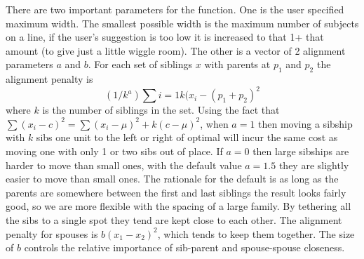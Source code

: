 \documentclass{article}
\begin{document}
There are two important parameters for the function.  One is the user specified
maximum width.  The smallest possible width is the maximum number of subjects
on a line, if the user's suggestion  %
is too low it is increased to that 1+ that
amount (to give just a little wiggle room).
The other is a vector of 2 alignment parameters $a$ and $b$.
For each set of siblings ${x}$ with parents at $p_1$ and $p_2$ the
alignment penalty is
$$
   (1/k^a)\sum{i=1}{k} (x_i - (p_1 + p_2)^2
$$
where $k$ is the number of siblings in the set.
Using the fact that $\sum(x_i-c)^2 = \sum(x_i-\mu)^2 + k(c-\mu)^2$,
when $a=1$ then moving a sibship with $k$ sibs one unit to the left or
right of optimal will incur the same cost as moving one with only 1 or
two sibs out of place.  If $a=0$ then large sibships are harder to move
than small ones, with the default value $a=1.5$ they are slightly easier 
to move than small ones.  The rationale for the default is as long as the
parents are somewhere between the first and last siblings the result looks
fairly good, so we are more flexible with the spacing of a large family.
By tethering all the sibs to a single spot they tend are kept close to 
each other.
The alignment penalty for spouses is $b(x_1 - x_2)^2$, which tends to keep 
them together.  The size of $b$ controls the relative importance of sib-parent
and spouse-spouse closeness.
\end{document}
